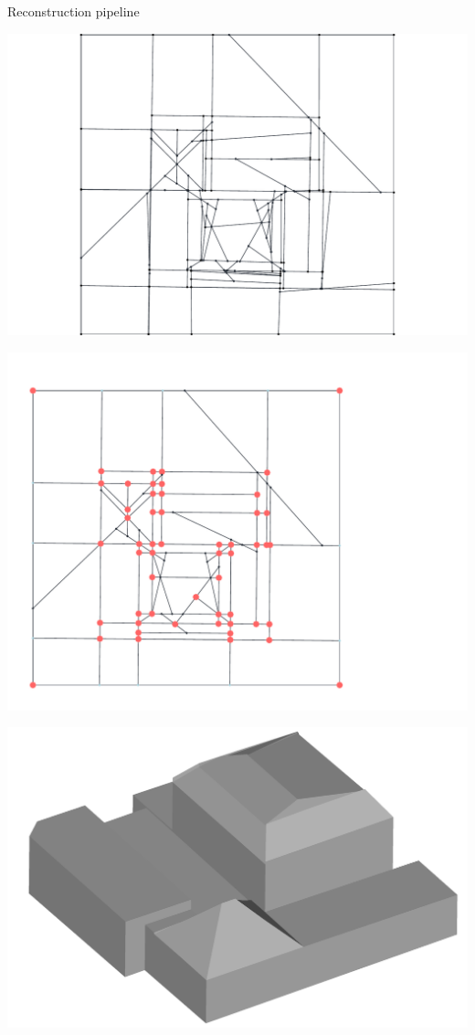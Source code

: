 \begin{frame}{Reconstruction pipeline}
\begin{minipage}[b]{0.2\linewidth}
		\includegraphics[width=\linewidth]{pipeline/original}
	\end{minipage}%
	\begin{minipage}[b]{0.2\linewidth}
		\includegraphics[width=\linewidth]{pipeline/simplified}
	\end{minipage}%
	\begin{minipage}[b]{0.2\linewidth}
		\includegraphics[width=\linewidth]{pipeline/mesh_crop}
	\end{minipage}


\end{frame}
